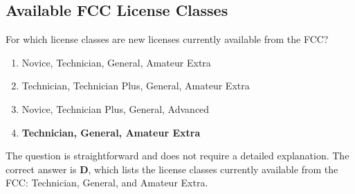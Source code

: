\subsection{Available FCC License Classes}
\label{T1C01}

\begin{tcolorbox}[colback=gray!10!white,colframe=black!75!black,title=T1C01]
For which license classes are new licenses currently available from the FCC?
\begin{enumerate}[label=\Alph*),noitemsep]
    \item Novice, Technician, General, Amateur Extra
    \item Technician, Technician Plus, General, Amateur Extra
    \item Novice, Technician Plus, General, Advanced
    \item \textbf{Technician, General, Amateur Extra}
\end{enumerate}
\end{tcolorbox}

The question is straightforward and does not require a detailed explanation. The correct answer is \textbf{D}, which lists the license classes currently available from the FCC: Technician, General, and Amateur Extra.